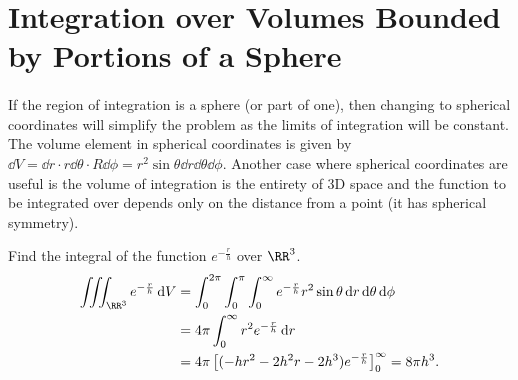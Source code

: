 \documentclass[../multivariate_calculus.tex]{subfiles}
\begin{document}
    \section{Integration over Volumes Bounded by Portions of a Sphere}
        \paragraph{}
        If the region of integration is a sphere (or part of one), then changing to spherical coordinates will simplify the problem as the limits of integration will be constant.
        The volume element in spherical coordinates is given by $\dd{V}=\dd{r}\cdot r\dd{\theta}\cdot R\dd{\phi}=r^2\sin\theta\dd{r}\dd{\theta}\dd{\phi}$.
        Another case where spherical coordinates are useful is the volume of integration is the entirety of 3D space and the function to be integrated over depends only on the distance from a point (it has spherical symmetry).
        \begin{example}
            Find the integral of the function $e^{-\frac{r}{h}}$ over $\RR^3$.
            \begin{align}
                \iiint_{\RR^3}e^{-\frac{r}{h}}\dd{V}&=\int_0^{2\pi}\int_0^\pi\int_0^\infty e^{-\frac{r}{h}}r^2\sin\theta\dd{r}\dd{\theta}\dd{\phi}\\
                &=4\pi\int_0^\infty r^2e^{-\frac{r}{h}}\dd{r}\\
                &=4\pi\left[(-hr^2-2h^2r-2h^3)e^{-\frac{r}{h}}\right]_0^\infty=8\pi h^3.
            \end{align}
        \end{example}
\end{document}
